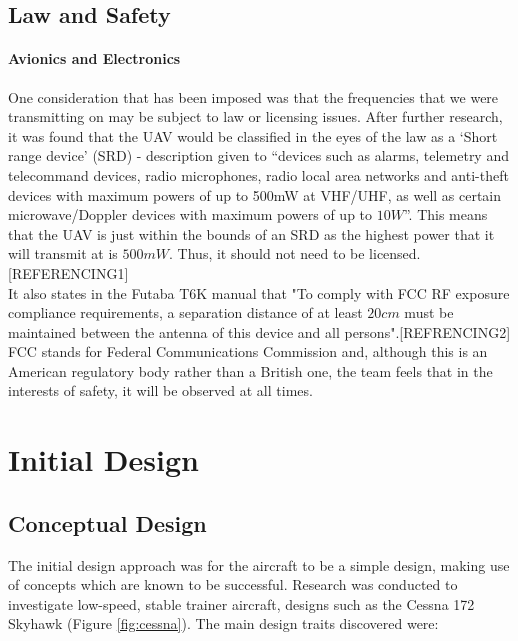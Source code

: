 \documentclass[12pt]{article}
\begin{document}
\subsection{Law and Safety}

\paragraph {Avionics and Electronics} One consideration that has been imposed was that the frequencies that we were transmitting on may be subject to law or licensing issues. After further research, it was found that the UAV would be classified in the eyes of the law as a ‘Short range device’ (SRD) - description given to “devices such as alarms, telemetry and telecommand devices, radio microphones, radio local area networks and anti-theft devices with maximum powers of up to 500mW at VHF/UHF, as well as certain microwave/Doppler devices with maximum powers of up to $10W$”. This means that the UAV is just within the bounds of an SRD as the highest power that it will transmit at is $500mW$. Thus, it should not need to be licensed.[REFERENCING1] \\

\noindent It also states in the Futaba T6K manual that "To comply with FCC RF exposure compliance requirements, a separation distance of at least $20cm$ must be maintained between the antenna of this device and all persons".[REFRENCING2] \\

\noindent FCC stands for Federal Communications Commission and, although this is an American regulatory body rather than a British one, the team feels that in the interests of safety, it will be observed at all times. \\

\section{Initial Design}

\subsection{Conceptual Design}
\noindent The initial design approach was for the aircraft to be a simple design, making use of concepts which are known to be successful. Research was conducted to investigate low-speed, stable trainer aircraft, designs such as the Cessna 172 Skyhawk (Figure \ref{fig:cessna}). The main design traits discovered were: 
\end{document}
